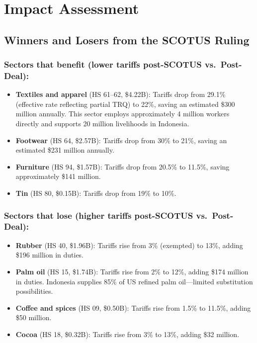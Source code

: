 \documentclass[12pt,a4paper]{article}
\begin{document}
\section{Impact Assessment}

\subsection{Winners and Losers from the SCOTUS Ruling}

\subsubsection*{Sectors that benefit (lower tariffs post-SCOTUS vs.\ Post-Deal):}

\begin{itemize}
    \item \textbf{Textiles and apparel} (HS 61--62, \$4.22B): Tariffs drop from 29.1\% (effective rate reflecting partial TRQ) to 22\%, saving an estimated \$300 million annually. This sector employs approximately 4 million workers directly and supports 20 million livelihoods in Indonesia.

    \item \textbf{Footwear} (HS 64, \$2.57B): Tariffs drop from 30\% to 21\%, saving an estimated \$231 million annually.

    \item \textbf{Furniture} (HS 94, \$1.57B): Tariffs drop from 20.5\% to 11.5\%, saving approximately \$141 million.

    \item \textbf{Tin} (HS 80, \$0.15B): Tariffs drop from 19\% to 10\%.
\end{itemize}

\subsubsection*{Sectors that lose (higher tariffs post-SCOTUS vs.\ Post-Deal):}

\begin{itemize}
    \item \textbf{Rubber} (HS 40, \$1.96B): Tariffs rise from 3\% (exempted) to 13\%, adding \$196 million in duties.

    \item \textbf{Palm oil} (HS 15, \$1.74B): Tariffs rise from 2\% to 12\%, adding \$174 million in duties. Indonesia supplies 85\% of US refined palm oil---limited substitution possibilities.

    \item \textbf{Coffee and spices} (HS 09, \$0.50B): Tariffs rise from 1.5\% to 11.5\%, adding \$50 million.

    \item \textbf{Cocoa} (HS 18, \$0.32B): Tariffs rise from 3\% to 13\%, adding \$32 million.
\end{itemize}
\end{document}

